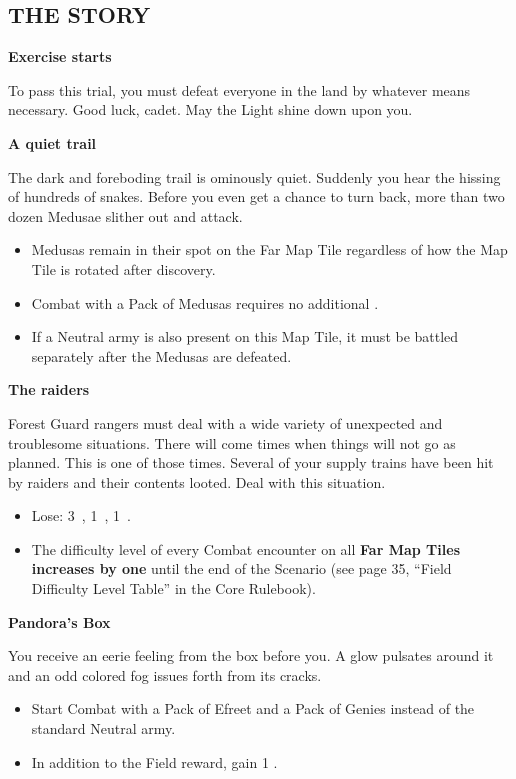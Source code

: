 \pagebreak

\begin{multicols*}{2}

\subsection*{\MakeUppercase{The Story}}

\textbf{Exercise starts}

To pass this trial, you must defeat everyone in the land by whatever means necessary.
Good luck, cadet.
May the Light shine down upon you.

\textbf{A quiet trail}

The dark and foreboding trail is ominously quiet.
Suddenly you hear the hissing of hundreds of snakes.
Before you even get a chance to turn back, more than two dozen Medusae slither out and attack.

\textcolor{darkcandyapplered}{
\begin{itemize}
    \item Medusas remain in their spot on the Far Map Tile regardless of how the Map Tile is rotated after discovery.
    \item Combat with a Pack of Medusas requires no additional .
    \item If a Neutral army is also present on this Map Tile, it must be battled separately after the Medusas are defeated.
\end{itemize}
}

\textbf{The raiders}

Forest Guard rangers must deal with a wide variety of unexpected and troublesome situations.
There will come times when things will not go as planned.
This is one of those times.
Several of your supply trains have been hit by raiders and their contents looted.
Deal with this situation.
\begin{itemize}
  \item \textcolor{darkcandyapplered}{Lose: 3~, 1~, 1~.}
  \item \textcolor{darkcandyapplered}{The difficulty level of every Combat encounter on all \textbf{Far Map Tiles increases by one} until the end of the Scenario} (see page 35, ``Field Difficulty Level Table'' in the Core Rulebook).  %
\end{itemize}

\textbf{Pandora's Box}

You receive an eerie feeling from the box before you.
A glow pulsates around it and an odd colored fog issues forth from its cracks.
\textcolor{darkcandyapplered}{
\begin{itemize}
    \item Start Combat with a Pack of Efreet and a Pack of Genies instead of the standard Neutral army.
    \item In addition to the Field reward, gain 1 .
\end{itemize}
}


\end{multicols*}
